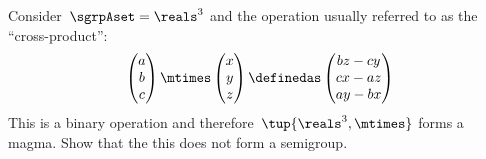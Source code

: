 \begin{exercise}
    \label{ex:cross_prod}
    Consider~$\sgrpAset=\reals^3$ and the operation usually referred to as the ``cross-product'':
    \begin{equation*}
        \begin{pmatrix}
            a\\ b\\ c
        \end{pmatrix}\mtimes \begin{pmatrix}
                                 x\\ y \\ z
        \end{pmatrix}\definedas
        \begin{pmatrix}
            bz-cy \\
            cx-az \\
            ay-bx
        \end{pmatrix}
    \end{equation*}
    This is a binary operation and therefore~$\tup{\reals^3,\mtimes}$ forms a magma. Show that the this does not form a semigroup.
\end{exercise}
%
